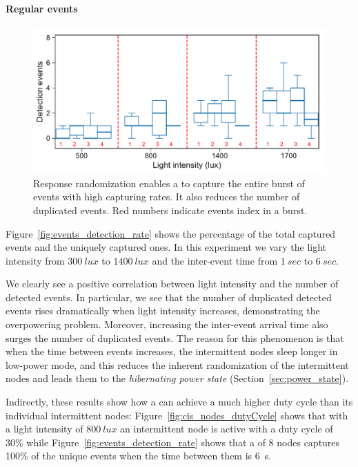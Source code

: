 \paragraph{Regular events}
\begin{figure}[t]
	\centering
     \includegraphics[width=\columnwidth]{figures/events_burst_rand}
    \caption{Response randomization enables a \sys to capture the entire burst of events with high capturing rates. It also reduces the number of duplicated events. Red numbers indicate events index in a burst.}
    \label{fig:events_burst_rand}
\end{figure}

Figure~\ref{fig:events_detection_rate} shows the percentage of the total captured events and the uniquely captured ones. In this experiment we vary the light intensity from $\SI{300}{lux}$ to $\SI{1400}{lux}$ and the inter-event time from $\SI{1}{sec}$ to $\SI{6}{sec}$. 

We clearly see a positive correlation between light intensity and the number of detected events. In particular, we see that the number of duplicated detected events rises dramatically when light intensity increases, demonstrating the overpowering problem. Moreover, increasing the inter-event arrival time also surges the number of duplicated events. The reason for this phenomenon is that when the time between events increases, the intermittent nodes sleep longer in low-power mode, and this reduces the inherent randomization of the intermittent nodes and leads them to the \textit{hibernating power state} (Section~\ref{sec:power_state}).  

Indirectly, these results show how a \sys can achieve a much higher duty cycle than its individual intermittent nodes: Figure~\ref{fig:cis_nodes_dutyCycle} shows that with a light intensity of $\SI{800}{lux}$ an intermittent node is active with a duty cycle of 30\% while Figure~\ref{fig:events_detection_rate} shows that a \sys of 8 nodes captures 100\% of the unique events when the time between them is \SI{6}{s}. 

